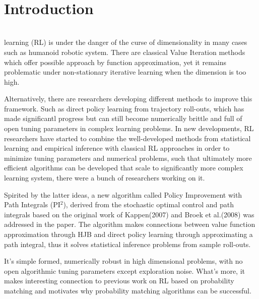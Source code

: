 \documentclass[journal]{IEEEtran}
\begin{document}
%
\IEEEpeerreviewmaketitle


\ \\
\section{Introduction}

\ \\

 learning (RL) is under the danger of the curse of dimensionality in many cases such as humanoid robotic system. There are classical Value Iteration methods which offer possible
approach by function approximation, yet it remains problematic under non-stationary iterative learning when the dimension is too high. 

Alternatively, there are researchers developing different methods to improve this framework. 
Such as direct policy learning from trajectory roll-outs, which has made significantl progress but can still become numerically brittle and full of open tuning parameters in complex learning problems. 
In new developments, RL researchers have started to combine the well-developed methods from statistical learning and empirical inference with classical RL approaches in order to minimize tuning parameters and numerical problems, 
such that ultimately more efficient algorithms can be developed that scale to significantly more complex learning
system, there were a bunch of researchers working on it.

Spirited by the latter ideas, a new algorithm called Policy Improvement with Path Integrals (PI$^2$), derived from the stochastic optimal control and path integrals based on the original work of Kappen(2007) and Broek et al.(2008) 
was addressed in the paper. The algorithm makes connections between value function approximation through HJB and direct policy learning through approximating a path integral, thus it solves statistical inference
problems from sample roll-outs. 

It's simple formed, numerically robust in high dimensional problems, with no open algorithmic tuning parameters except exploration noise. What's more, it makes interesting connection to previous work on RL based on
probability matching and motivates why probability matching algorithms can be successful.
\end{document}
